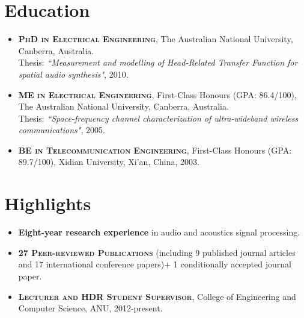 \documentclass[11pt]{article}
\begin{document}
\begin{itemize}
%
%
%
%

\end{itemize}

\section*{Education}
\begin{itemize}
\item \textsc{\textbf{PhD in Electrical Engineering}}, The Australian National University,
Canberra, Australia.\\
Thesis: \emph{``Measurement and modelling of Head-Related Transfer Function for spatial audio synthesis"},
2010.
\item \textsc{\textbf{ME in Electrical Engineering}}, First-Class Honours (GPA: 86.4/100), The Australian National University, Canberra, Australia.\\
Thesis: \emph{``Space-frequency channel characterization of ultra-wideband wireless
communications"}, 2005.
\item \textsc{\textbf{BE in Telecommunication Engineering}},
First-Class Honours (GPA: 89.7/100), Xidian University, Xi'an, China, 2003.
\end{itemize}

\section*{Highlights}
%
\begin{itemize}
%
\item \textbf{Eight-year research experience} in audio and acoustics signal processing.

\item \textsc{\textbf{27 Peer-reviewed Publications}} (including 9 published journal articles and 17 international conference papers)+ 1 conditionally accepted journal paper.


\item \textsc{\textbf{Lecturer and HDR Student Supervisor}}, College of Engineering and Computer Science, ANU, 2012-present.
%

\end{itemize}
\end{document}
